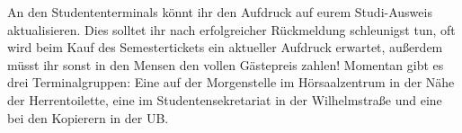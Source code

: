  An den Studententerminals könnt ihr den Aufdruck auf eurem
  Studi-Ausweis aktualisieren. Dies solltet ihr nach erfolgreicher Rückmeldung schleunigst tun,
  oft wird beim Kauf des Semestertickets ein aktueller Aufdruck erwartet, außerdem müsst ihr sonst in den Mensen
  den vollen Gästepreis zahlen!
   Momentan gibt es drei Terminalgruppen:
  Eine auf der Morgenstelle im Hörsaalzentrum in der Nähe der Herrentoilette,
  eine im Studentensekretariat in der Wilhelmstraße und eine bei den Kopierern in der UB.
  

